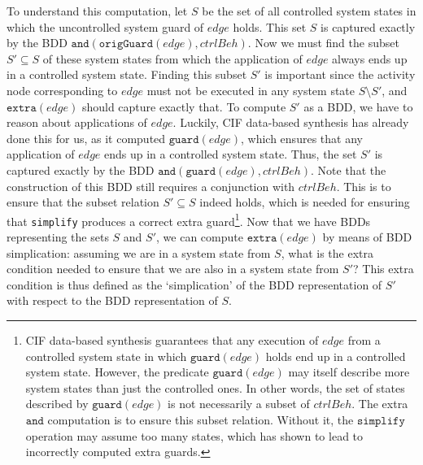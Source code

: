 \documentclass{article}
\theoremstyle{definition}
\begin{document}
To understand this computation, let $S$ be the set of all controlled system states in which the uncontrolled system guard of $\mathit{edge}$ holds.
This set $S$ is captured exactly by the BDD $\texttt{and}(\texttt{origGuard}(\mathit{edge}), \mathit{ctrlBeh})$.
Now we must find the subset $S' \subseteq S$ of these system states from which the application of $\mathit{edge}$ always ends up in a controlled system state.
Finding this subset $S'$ is important since the activity node corresponding to $\mathit{edge}$ must not be executed in any system state $S \setminus S'$, and $\texttt{extra}(\mathit{edge})$ should capture exactly that.
To compute $S'$ as a BDD, we have to reason about applications of $\mathit{edge}$.
Luckily, CIF data-based synthesis has already done this for us, as it computed $\texttt{guard}(\mathit{edge})$, which ensures that any application of $\mathit{edge}$ ends up in a controlled system state.
Thus, the set $S'$ is captured exactly by the BDD $\texttt{and}(\texttt{guard}(\mathit{edge}), \mathit{ctrlBeh})$.
Note that the construction of this BDD still requires a conjunction with $\mathit{ctrlBeh}$.
This is to ensure that the subset relation $S' \subseteq S$ indeed holds, which is needed for ensuring that \texttt{simplify} produces a correct extra guard\footnote{CIF data-based synthesis guarantees that any execution of $\mathit{edge}$ from a controlled system state in which $\texttt{guard}(\mathit{edge})$ holds end up in a controlled system state.
However, the predicate $\texttt{guard}(\mathit{edge})$ may itself describe more system states than just the controlled ones.
In other words, the set of states described by $\texttt{guard}(\mathit{edge})$ is not necessarily a subset of $\mathit{ctrlBeh}$.
The extra $\texttt{and}$ computation is to ensure this subset relation.
Without it, the $\texttt{simplify}$ operation may assume too many states, which has shown to lead to incorrectly computed extra guards.}.
Now that we have BDDs representing the sets $S$ and $S'$, we can compute $\texttt{extra}(\mathit{edge})$ by means of BDD simplication: assuming we are in a system state from $S$, what is the extra condition needed to ensure that we are also in a system state from $S'$?
This extra condition is thus defined as the `simplication' of the BDD representation of $S'$ with respect to the BDD representation of $S$.
\end{document}
